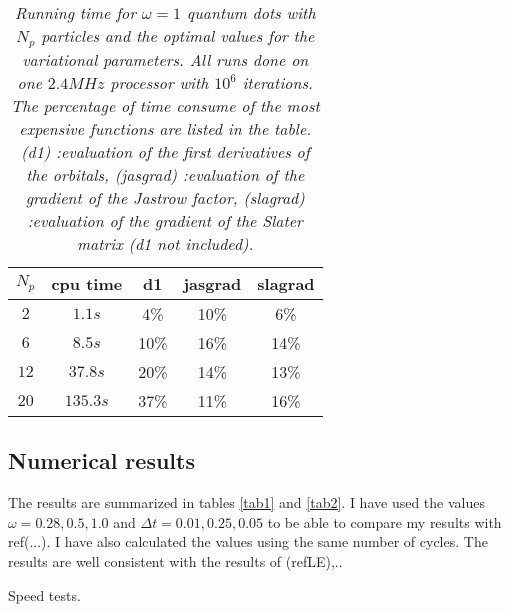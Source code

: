 \documentclass[a4paper,10pt,twocolumn]{article} %
\newcommand{\expec}[1]{\langle{}{#1}\rangle{}}
\begin{document}
\begin{table}[h!]
\begin{center}
\begin{tabular}{|c|c|c|c|c|}
\hline
$N_{p}$ & cpu time & d1  & jasgrad  & slagrad  \\ 
\hline
\hline
 $2$  & $1.1s$ &4\% &10\% &6\%\\ 
 $6$  & $8.5s$ & 10\% &16\% &14\%\\ 
 $12$ & $37.8s$ & 20\% &14\% &13\%\\ 
 $20$ & $135.3s$ & 37\% &11\% &16\%\\ 
\hline
\end{tabular}
\end{center}
\caption{{\it 
	Running time for $\omega=1$ quantum dots with $N_p$ particles and the optimal values for the variational parameters. All runs done on one $2.4 MHz$ processor with $10^6$ iterations.
	The percentage of time consume of the most expensive functions are listed in the table. 
	(d1) :evaluation of the first derivatives of the orbitals,
	(jasgrad)  :evaluation of the gradient of the Jastrow factor,
	(slagrad)  :evaluation of the gradient of the Slater matrix (d1 not included).
}}
\label{tab:scaletime}
\end{table}


\subsection{Numerical results}

The results are summarized in tables \ref{tab1} and \ref{tab2}. I have used the values $\omega=0.28,0.5,1.0$ and $\Delta t = 0.01,0.25,0.05$ to be able to compare my 
results with ref(...). I have also calculated the values using the same number of cycles. The results are well consistent with the results of (refLE),..

Speed tests.

\end{document}
